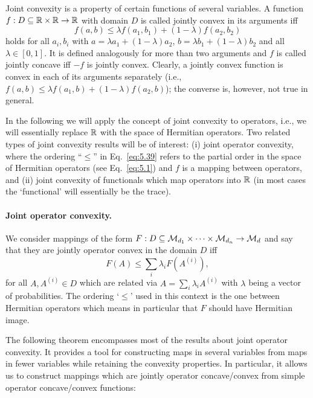 \documentclass[11pt,a4paper]{article}
\theoremstyle{plain}
\theoremstyle{definition}
\theoremstyle{remark}
\numberwithin{equation}{section}
\begin{document}
Joint convexity is a property of certain functions of several variables. A function
$f:D\subseteq \mathbb{R}\times \mathbb{R}\to \mathbb{R}$ with domain $D$ is called jointly convex in its
arguments iff
\begin{equation}\label{eq:5.39}
    f(a,b) \le \lambda f(a_1,b_1) + (1-\lambda) f(a_2,b_2)
\end{equation}
holds for all $a_i,b_i$ with $a=\lambda a_1+(1-\lambda)a_2$, $b=\lambda b_1+(1-\lambda)b_2$
and all $\lambda\in[0,1]$. It is defined analogously for more than two arguments and
$f$ is called jointly concave iff $-f$ is jointly convex. Clearly, a jointly convex
function is convex in each of its arguments separately (i.e., $f(a,b)\le \lambda f(a_1,b)+(1-\lambda)f(a_2,b)$);
the converse is, however, not true in general.

In the following we will apply the concept of joint convexity to operators, i.e., we
will essentially replace $\mathbb{R}$ with the space of Hermitian operators. Two related
types of joint convexity results will be of interest: (i) joint operator convexity,
where the ordering ``$\le$'' in Eq.~\eqref{eq:5.39} refers to the partial order in the
space of Hermitian operators (see Eq.~\eqref{eq:5.1}) and $f$ is a mapping between
operators, and (ii) joint convexity of functionals which map operators into $\mathbb{R}$ (in
most cases the `functional' will essentially be the trace).

\paragraph{Joint operator convexity.}
We consider mappings of the form $F:D\subseteq \mathcal{M}_{d_1}\times \cdots \times \mathcal{M}_{d_n} \to \mathcal{M}_d$
and say that they are jointly operator convex in the domain $D$ iff
\begin{equation}\label{eq:5.40}
    F(A) \le \sum_i \lambda_i F(A^{(i)}),
\end{equation}
for all $A,A^{(i)}\in D$ which are related via $A=\sum_i \lambda_i A^{(i)}$ with
$\lambda$ being a vector of probabilities. The ordering `$\le$' used in this context
is the one between Hermitian operators which means in particular that $F$ should have
Hermitian image.

The following theorem encompasses most of the results about joint operator convexity.
It provides a tool for constructing maps in several variables from maps in fewer
variables while retaining the convexity properties. In particular, it allows us to
construct mappings which are jointly operator concave/convex from simple operator
concave/convex functions:
\end{document}
